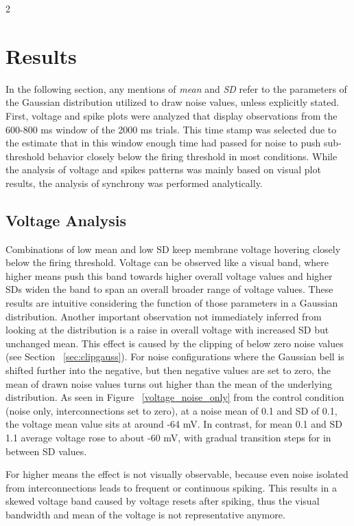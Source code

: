 \documentclass[12pt,a4paper]{article}
\begin{document}
\begin{multicols}{2}
		\section{Results}
            In the following section, any mentions of \textit{mean} and \textit{SD} refer to the parameters of the Gaussian distribution utilized to draw noise values, unless explicitly stated. First, voltage and spike plots were analyzed that display observations from the 600-800 ms window of the 2000 ms trials. This time stamp was selected due to the estimate that in this window enough time had passed for noise to push sub-threshold behavior closely below the firing threshold in most conditions. While the analysis of voltage and spikes patterns was mainly based on visual plot results, the analysis of synchrony was performed analytically.

        \subsection{Voltage Analysis}
            Combinations of low mean and low SD keep membrane voltage hovering closely below the firing threshold. Voltage can be observed like a visual band, where higher means push this band towards higher overall voltage values and higher SDs widen the band to span an overall broader range of voltage values. These results are intuitive considering the function of those parameters in a Gaussian distribution. Another important observation not immediately inferred from looking at the distribution is a raise in overall voltage with increased SD but unchanged mean. This effect is caused by the clipping of below zero noise values (see Section ~\ref{sec:clipgauss}). For noise configurations where the Gaussian bell is shifted further into the negative, but then negative values are set to zero, the mean of drawn noise values turns out higher than the mean of the underlying distribution. As seen in Figure ~\ref{voltage_noise_only} from the control condition (noise only, interconnections set to zero), at a noise mean of 0.1 and SD of 0.1, the voltage mean value sits at around -64 mV. In contrast, for mean 0.1 and SD 1.1 average voltage rose to about -60 mV, with gradual transition steps for in between SD values.
            
            For higher means the effect is not visually observable, because even noise isolated from interconnections leads to frequent or continuous spiking. This results in a skewed voltage band caused by voltage resets after spiking, thus the visual bandwidth and mean of the voltage is not representative anymore.
        

\end{multicols}
\end{document}

